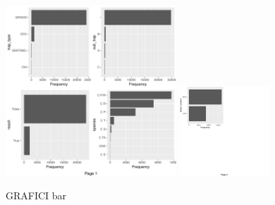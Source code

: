 \begin{figure}[H]
	\centering
	\includegraphics[width=0.57\textwidth]{images/ml/plot_bar1}
	\includegraphics[width=0.3\textwidth]{images/ml/plot_bar2}
	\caption{GRAFICI bar}
	\label{fig:plot_bar}
\end{figure}


